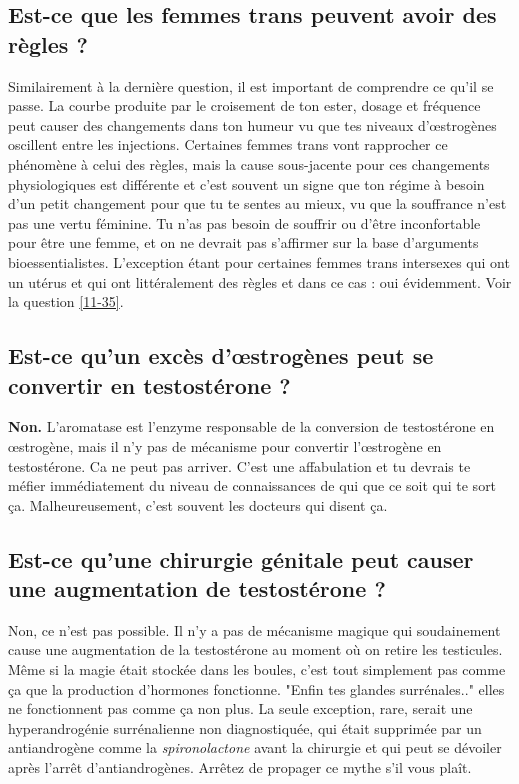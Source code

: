 \documentclass{article}
\begin{document}
\subsection{Est-ce que les femmes trans peuvent avoir des règles ?}

Similairement à la dernière question, il est important de comprendre ce qu'il se passe. La courbe produite par le croisement de ton ester, dosage et fréquence peut causer des changements dans ton humeur vu que tes niveaux d'œstrogènes oscillent entre les injections. Certaines femmes trans vont rapprocher ce phénomène à celui des règles, mais la cause sous-jacente pour ces changements physiologiques est différente et c'est souvent un signe que ton régime à besoin d'un petit changement pour que tu te sentes au mieux, vu que la souffrance n'est pas une vertu féminine. Tu n'as pas besoin de souffrir ou d'être inconfortable pour être une femme, et on ne devrait pas s'affirmer sur la base d'arguments bioessentialistes. L'exception étant pour certaines femmes trans intersexes qui ont un utérus et qui ont littéralement des règles et dans ce cas : oui évidemment. Voir la question \ref{11-35}.

\subsection{Est-ce qu'un excès d'œstrogènes peut se convertir en testostérone ?}

\textbf{Non.} L'aromatase est l'enzyme responsable de la conversion de testostérone en œstrogène, mais il n'y pas de mécanisme pour convertir l'œstrogène en testostérone. Ca ne peut pas arriver. C'est une affabulation et tu devrais te méfier immédiatement du niveau de connaissances de qui que ce soit qui te sort ça. Malheureusement, c'est souvent les docteurs qui disent ça.

\subsection{Est-ce qu'une chirurgie génitale peut causer une augmentation de testostérone ?}

Non, ce n'est pas possible. Il n'y a pas de mécanisme magique qui soudainement cause une augmentation de la testostérone au moment où on retire les testicules. Même si la magie était stockée dans les boules, c'est tout simplement pas comme ça que la production d'hormones fonctionne. "Enfin tes glandes surrénales.." elles ne fonctionnent pas comme ça non plus. La seule exception, rare, serait une hyperandrogénie surrénalienne non diagnostiquée, qui était supprimée par un antiandrogène comme la \textit{spironolactone} avant la chirurgie et qui peut se dévoiler après l'arrêt d'antiandrogènes. Arrêtez de propager ce mythe s'il vous plaît. 
\end{document}
